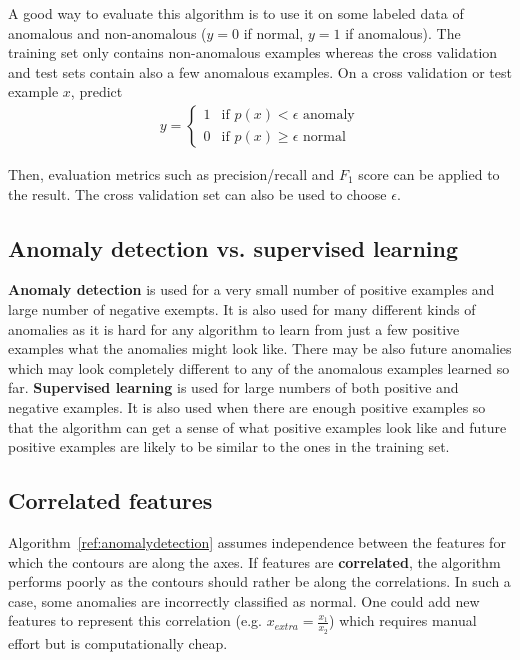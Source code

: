 \documentclass{report}
\begin{document}
A good way to evaluate this algorithm is to use it on some labeled data of anomalous and non-anomalous ($y=0$ if normal, $y=1$ if anomalous). The training set only contains non-anomalous examples whereas the cross validation and test sets contain also a few anomalous examples. On a cross validation or test example $x$, predict
\begin{align*}
y = \left\{
\begin{array}{lll}
1  & \mbox{if } p(x) < \epsilon \mbox{ anomaly} \\
0  & \mbox{if } p(x) \ge \epsilon \mbox{ normal}
\end{array}
\right.
\end{align*}

Then, evaluation metrics such as precision/recall and $F_1$ score can be applied to the result. The cross validation set can also be used to choose $\epsilon$.

\subsection{Anomaly detection vs. supervised learning}
{\bf Anomaly detection} is used for a very small number of positive examples and large number of negative exempts. It is also used for many different kinds of anomalies as it is hard for any algorithm to learn from just a few positive examples what the anomalies might look like. There may be also future anomalies which may look completely different to any of the anomalous examples learned so far. {\bf Supervised learning} is used for large numbers of both positive and negative examples. It is also used when there are enough positive examples so that the algorithm can get a sense of what positive examples look like and future positive examples are likely to be similar to the ones in the training set.

\subsection{Correlated features}
Algorithm~\ref{ref:anomalydetection} assumes independence between the features for which the contours are along the axes. If features are {\bf correlated}, the algorithm performs poorly as the contours should rather be along the correlations. In such a case, some anomalies are incorrectly classified as normal. One could add new features to represent this correlation (e.g. $x_{extra}=\frac{x_1}{x_2}$) which requires manual effort but is computationally cheap. \\
\end{document}
